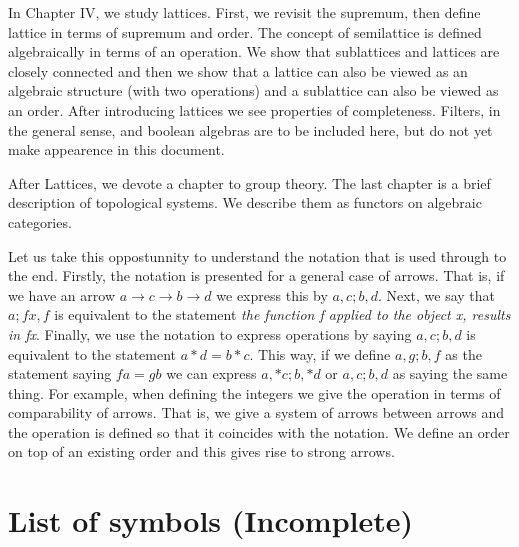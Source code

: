 \documentclass [12pt]{book}
\begin{document}
In Chapter IV, we study lattices. First, we revisit the supremum, then define lattice in terms of supremum and order. The concept of semilattice is defined algebraically in terms of an operation. We show that sublattices and lattices are closely connected and then we show that a lattice can also be viewed as an algebraic structure (with two operations) and a sublattice can also be viewed as an order. After introducing lattices we see properties of completeness. Filters, in the general sense, and boolean algebras are to be included here, but do not yet make appearence in this document.

After Lattices, we devote a chapter to group theory. The last chapter is a brief description of topological systems. We describe them as functors on algebraic categories.

Let us take this oppostunnity to understand the notation that is used through to the end. Firstly, the notation is presented for a general case of arrows. That is, if we have an arrow $a\rightarrow c\longrightarrow b\rightarrow d$ we express this by $a,c;b,d$. Next, we say that $a;fx,f$ is equivalent to the statement \textit{the function f applied to the object x, results in fx}. Finally, we use the notation to express operations by saying $a,c;b,d$ is equivalent to the statement $a*d=b*c$. 
This way, if we define $a,g;b,f$ as the statement saying $fa=gb$ we can express $a,*c;b,*d$ or $a,c;b,d$ as saying the same thing. For example, when defining the integers we give the operation in terms of comparability of arrows. That is, we give  a system of arrows between arrows and the operation is defined so that it coincides with the notation. We define an order on top of an existing order and this gives rise to strong arrows.

\chapter*{List of symbols (Incomplete)}
\end{document}

